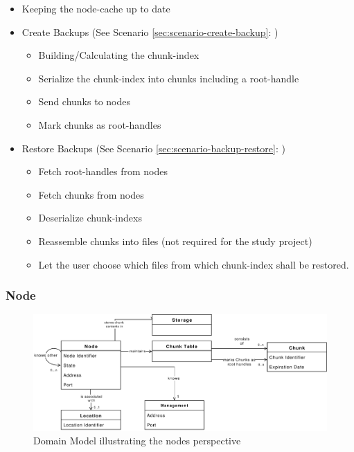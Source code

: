 \begin{itemize}
    \item Keeping the \gls{node-cache} up to date
    \item Create Backups (See Scenario \ref{sec:scenario-create-backup}: )
    \begin{itemize}
        \item Building/Calculating the \gls{chunk-index}
        \item Serialize the \gls{chunk-index} into \glspl{chunk} including a \gls{root-handle}
        \item Send \glspl{chunk} to \glspl{node}
        \item Mark \glspl{chunk} as \glspl{root-handle}
    \end{itemize}
    \item Restore Backups (See Scenario \ref{sec:scenario-backup-restore}: )
    \begin{itemize}
        \item Fetch \glspl{root-handle} from \glspl{node}
        \item Fetch \glspl{chunk} from \glspl{node}
        \item Deserialize \glspl{chunk-index}
        \item Reassemble \glspl{chunk} into \glspl{file} (not required for the study project)
        \item Let the \gls{user} choose which \glspl{file} from which \gls{chunk-index} shall be restored.
    \end{itemize}
\end{itemize}

\subsubsection{Node}\label{sec:component-node}

\begin{figure}[h]
    \centering
    \includegraphics[width=1\linewidth]{resources/node_domain_model}
    \caption[Node Domain Model]{Domain Model illustrating the \glspl{node} perspective}
\end{figure}

